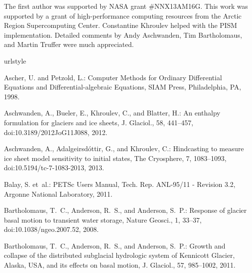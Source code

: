 \documentclass[gmd]{copernicus}   %
\begin{document}
\begin{acknowledgements}
The first author was supported by NASA grant \#NNX13AM16G.  This work was supported by a grant of high-performance computing resources from the Arctic Region Supercomputing Center.  Constantine Khroulev helped with the PISM implementation.  Detailed comments by Andy Aschwanden, Tim Bartholomaus, and Martin Truffer were much appreciated.
\end{acknowledgements}


%

\begin{thebibliography}{67}
\providecommand{\natexlab}[1]{#1}
\providecommand{\url}[1]{{\tt #1}}
\providecommand{\urlprefix}{URL }
\expandafter\ifx\csname urlstyle\endcsname\relax
  \providecommand{\doi}[1]{doi:\discretionary{}{}{}#1}\else
  \providecommand{\doi}{doi:\discretionary{}{}{}\begingroup
  \urlstyle{rm}\Url}\fi

Ascher, U. and Petzold, L.: Computer {M}ethods for {O}rdinary {D}ifferential
  {E}quations and {D}ifferential-algebraic {E}quations, SIAM Press,
  Philadelphia, PA, 1998.

Aschwanden, A., Bueler, E., Khroulev, C., and Blatter, H.: An enthalpy
  formulation for glaciers and ice sheets, J. Glaciol., 58, 441--457,
  \doi{10.3189/2012JoG11J088}, 2012.

Aschwanden, A., Adalgeirsd{\'o}ttir, G., and Khroulev, C.: Hindcasting to
  measure ice sheet model sensitivity to initial states, The Cryosphere, 7,
  1083--1093, \doi{10.5194/tc-7-1083-2013}, 2013.

Balay, S. et~al.: {PETS}c {U}sers {M}anual, Tech. Rep. ANL-95/11 - Revision
  3.2, Argonne National Laboratory, 2011.

Bartholomaus, T.~C., Anderson, R.~S., and Anderson, S.~P.: Response of glacier
  basal motion to transient water storage, Nature Geosci., 1, 33--37,
  \doi{10.1038/ngeo.2007.52}, 2008.

Bartholomaus, T.~C., Anderson, R.~S., and Anderson, S.~P.: Growth and collapse
  of the distributed subglacial hydrologic system of {K}ennicott {G}lacier,
  {A}laska, {USA}, and its effects on basal motion, J. Glaciol., 57, 985--1002,
  2011.


\end{thebibliography}
\end{document}
